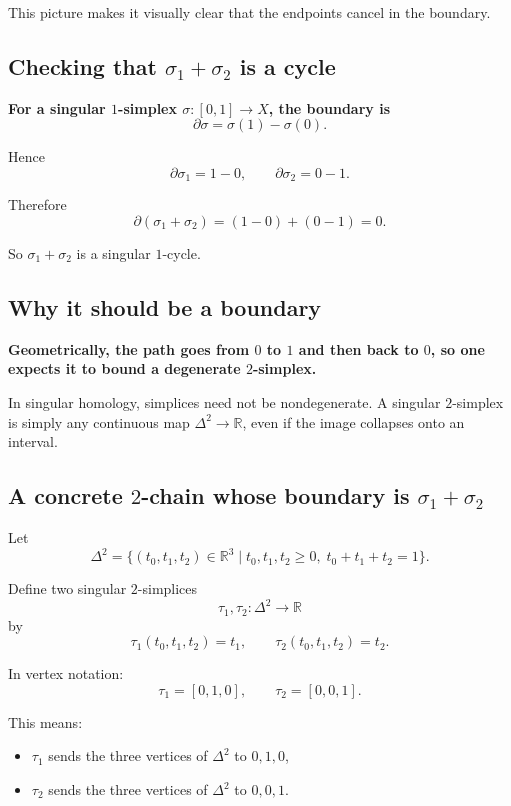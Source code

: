 \documentclass[12pt,a4paper]{article}
\theoremstyle{notespace}
\begin{document}
This picture makes it visually clear that the endpoints cancel in the boundary.

\subsection{Checking that \(\sigma_1+\sigma_2\) is a cycle}

\textbf{For a singular \(1\)-simplex \(\sigma:[0,1]\to X\), the boundary is}
\[
\partial \sigma = \sigma(1)-\sigma(0).
\]

Hence
\[
\partial \sigma_1 = 1-0,
\qquad
\partial \sigma_2 = 0-1.
\]

Therefore
\[
\partial(\sigma_1+\sigma_2)
=
(1-0)+(0-1)=0.
\]

So \(\sigma_1+\sigma_2\) is a singular \(1\)-cycle.

\subsection{Why it should be a boundary}

\textbf{Geometrically, the path goes from \(0\) to \(1\) and then back to \(0\), so one expects it to bound a degenerate \(2\)-simplex.}

In singular homology, simplices need not be nondegenerate. A singular \(2\)-simplex is simply any continuous map \(\Delta^2\to \mathbb{R}\), even if the image collapses onto an interval.

\subsection{A concrete \(2\)-chain whose boundary is \(\sigma_1+\sigma_2\)}

Let
\[
\Delta^2=\{(t_0,t_1,t_2)\in\mathbb{R}^3 \mid t_0,t_1,t_2\ge0,\; t_0+t_1+t_2=1\}.
\]

Define two singular \(2\)-simplices
\[
\tau_1,\tau_2:\Delta^2\to \mathbb{R}
\]
by
\[
\tau_1(t_0,t_1,t_2)=t_1,
\qquad
\tau_2(t_0,t_1,t_2)=t_2.
\]

In vertex notation:
\[
\tau_1=[0,1,0],
\qquad
\tau_2=[0,0,1].
\]

This means:

\begin{itemize}
	\item \(\tau_1\) sends the three vertices of \(\Delta^2\) to \(0,1,0\),
	\item \(\tau_2\) sends the three vertices of \(\Delta^2\) to \(0,0,1\).
\end{itemize}
\end{document}
